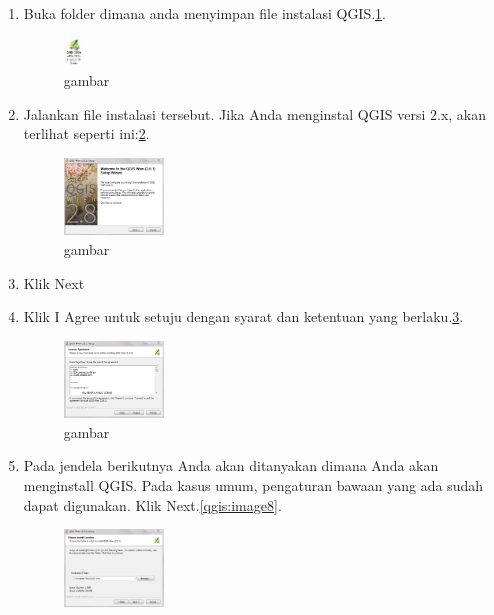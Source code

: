 \begin{enumerate}
\item
Buka folder dimana anda menyimpan file instalasi QGIS.\ref{qgis:image5}.
\begin{figure}[ht]
        \centerline{\includegraphics[width=0.05\textwidth]{figures/image5}}
        \caption{gambar}
        \label{qgis:image5}
        \end{figure}
\item
Jalankan file instalasi tersebut. Jika Anda menginstal QGIS versi 2.x, akan terlihat seperti ini:\ref{qgis:image6}.
\begin{figure}[ht]
        \centerline{\includegraphics[width=0.25\textwidth]{figures/image6}}
        \caption{gambar}
        \label{qgis:image6}
        \end{figure}
\item 
Klik Next
\item
Klik I Agree untuk setuju dengan syarat dan ketentuan yang berlaku.\ref{qgis:image7}.
\begin{figure}[ht]
        \centerline{\includegraphics[width=0.25\textwidth]{figures/image7}}
        \caption{gambar}
        \label{qgis:image7}
        \end{figure}
\item
Pada jendela berikutnya Anda akan ditanyakan dimana Anda akan menginstall QGIS. Pada kasus umum, pengaturan bawaan yang ada sudah dapat digunakan. Klik Next.\ref{qgis:image8}.
\begin{figure}[ht]
        \centerline{\includegraphics[width=0.25\textwidth]{figures/image8}}

\end{figure}
\end{enumerate}
